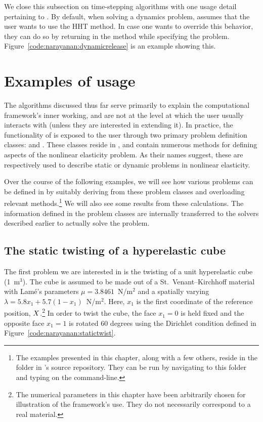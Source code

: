 We close this subsection on time-stepping algorithms with one usage
detail pertaining to \twist. By default, when solving a dynamics
problem, \twist{} assumes that the user wants to use the HHT
method. In case one wants to override this behavior, they can do so
by returning  in the  method while
specifying the problem. Figure~\ref{code:narayanan:dynamicrelease} is
an example showing this.

\section{Examples of \twist{} usage}

The algorithms discussed thus far serve primarily to explain the
computational framework's inner working, and are not at the level at
which the user usually interacts with \twist{} (unless they are
interested in extending it). In practice, the functionality of \twist{}
is exposed to the user through two primary problem definition classes:
 and . These classes
reside in , and contain numerous methods
for defining aspects of the nonlinear elasticity problem. As their
names suggest, these are respectively used to describe static or
dynamic problems in nonlinear elasticity.

Over the course of the following examples, we will see how various
problems can be defined in \twist{} by suitably deriving from these
problem classes and overloading relevant methods.\footnote{The
examples presented in this chapter, along with a few others, reside in
the  folder in \twist's source repository. They can
be run by navigating to this folder and typing  on the command-line.} We will also see some results
from these calculations. The information defined in the problem
classes are internally transferred to the solvers described earlier to
actually solve the problem.

\subsection{The static twisting of a hyperelastic cube}

The first problem we are interested in is the twisting of a unit
hyperelastic cube (1~m$^3$). The cube is assumed to be made out of a
St.~Venant--Kirchhoff material with Lam\'e's parameters $\mu =
3.8461$~N/m$^2$ and a spatially varying $\lambda = 5.8 x_{1} + 5.7 (1
- x_{1})$~N/m$^2$. Here, $x_{1}$ is the first coordinate of the
reference position, $\mbox{$ X$}$.\footnote{The numerical parameters in this
chapter have been arbitrarily chosen for illustration of the
framework's use. They do not necessarily correspond to a real
material.} In order to twist the cube, the face $x_{1} = 0$ is held
fixed and the opposite face $x_{1} = 1$ is rotated 60 degrees using
the Dirichlet condition defined in
Figure~\ref{code:narayanan:statictwist}.

